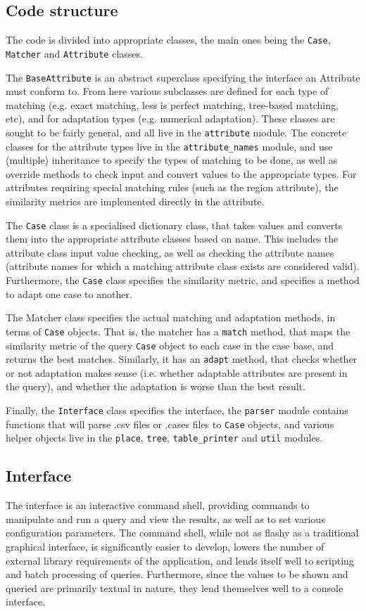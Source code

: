 \documentclass[a4paper,11pt]{scrartcl}
\begin{document}
\subsection{Code structure}
The code is divided into appropriate classes, the main ones being the
\texttt{Case}, \texttt{Matcher} and \texttt{Attribute} classes.

The \texttt{BaseAttribute} is an abstract superclass specifying the interface
an Attribute must conform to. From here various subclasses are defined
for each type of matching (e.g. exact matching, less is perfect
matching, tree-based matching, etc), and for adaptation types (e.g.
numerical adaptation). These classes are sought to be fairly general,
and all live in the \texttt{attribute} module. The concrete classes for the
attribute types live in the \texttt{attribute\_names} module, and use
(multiple) inheritance to specify the types of matching to be done, as
well as override methods to check input and convert values to the
appropriate types. For attributes requiring special matching rules
(such as the region attribute), the similarity metrics are implemented
directly in the attribute.

The \texttt{Case} class is a specialised dictionary class, that takes
values and converts them into the appropriate attribute classes based
on name. This includes the attribute class input value checking, as
well as checking the attribute names (attribute names for which a
matching attribute class exists are considered valid). Furthermore,
the \texttt{Case} class specifies the similarity metric, and specifies
a method to adapt one case to another.

The Matcher class specifies the actual matching and adaptation
methods, in terms of \texttt{Case} objects. That is, the matcher has a
\texttt{match} method, that maps the similarity metric of the query
\texttt{Case} object to each case in the case base, and returns the
best matches. Similarly, it has an \texttt{adapt} method, that checks
whether or not adaptation makes sense (i.e. whether adaptable
attributes are present in the query), and whether the adaptation is
worse than the best result.

Finally, the \texttt{Interface} class specifies the interface, the
\texttt{parser} module contains functions that will parse .csv files
or .cases files to \texttt{Case} objects, and various helper objects
live in the \texttt{place}, \texttt{tree}, \texttt{table\_printer} and
\texttt{util} modules.

\subsection{Interface}
The interface is an interactive command shell, providing commands to
manipulate and run a query and view the results, as well as to set
various configuration parameters. The command shell, while not as
flashy as a traditional graphical interface, is significantly easier
to develop, lowers the number of external library requirements of the
application, and lends itself well to scripting and batch processing
of queries. Furthermore, since the values to be shown and queried are
primarily textual in nature, they lend themselves well to a console
interface.
\end{document}
